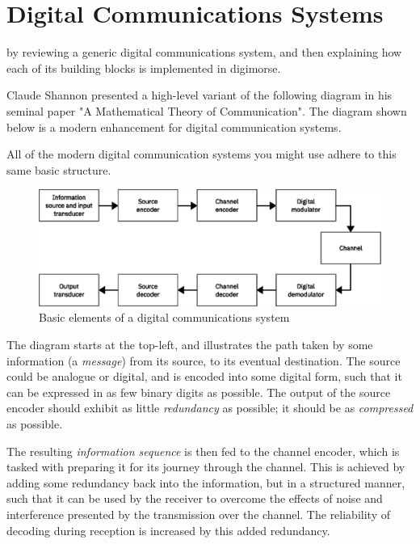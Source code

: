 \documentclass[a4paper]{tufte-handout}
\begin{document}
\pagebreak
\section{Digital Communications Systems}
 by reviewing a generic
    digital communications system, and then explaining how each of its building
    blocks is implemented in digimorse.

    Claude Shannon presented a high-level variant of the following diagram in his seminal paper "A Mathematical
    Theory of Communication"\cite{Shannon1948}. The diagram shown below is a modern enhancement for digital
    communication systems.

    All of the modern digital communication systems you might use adhere to this same basic structure.

    \begin{figure}[h]
        \includegraphics[width=\linewidth]{images/digital-communication-system}
        \caption{Basic elements of a digital communications system}
        \label{fig:digcomms}
    \end{figure}


    The diagram starts at the top-left, and illustrates the path taken by some information (a \emph{message}) from
    its source, to its eventual destination.
    The source could be analogue or digital, and is encoded into some digital form, such that it can be expressed in
    as few binary digits as possible.
    The output of the source encoder should exhibit as little \emph{redundancy} as possible; it should be as
    \emph{compressed} as possible.

    The resulting \emph{information sequence} is then fed to the channel encoder, which is tasked with preparing it
    for its journey through the channel.
    This is achieved by adding some redundancy back into the information, but in a structured manner, such that it
    can be used by the receiver to overcome the effects of noise and interference presented by the transmission over
    the channel.
    The reliability of decoding during reception is increased by this added redundancy.
\end{document}

